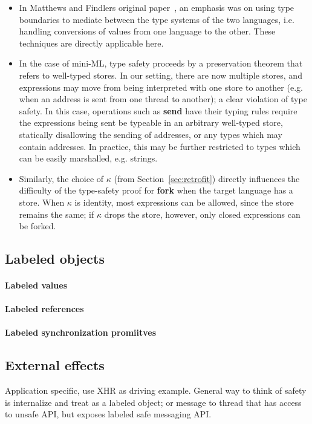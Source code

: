 \begin{itemize}
    \item In Matthews and Findlers original
        paper~\cite{Matthews:2007:OSM:1190216.1190220}, an emphasis was
        on using type boundaries to mediate between the type systems of
        the two languages, i.e. handling conversions of values from
        one language to the other.  These techniques are directly applicable here.

    \item In the case of mini-ML, type safety proceeds by a preservation theorem
        that refers to well-typed stores.  In our setting, there are now multiple
        stores, and expressions may move from being interpreted with one store
        to another (e.g. when an address is sent from one thread to
        another); a clear violation of type safety.  In this case, operations
        such as \textbf{send} have their typing rules require
        the expressions being sent be typeable in an arbitrary well-typed store,
        statically disallowing the sending of addresses, or any types which
        may contain addresses.  In practice, this may be further restricted to
        types which can be easily marshalled, e.g. strings.

    \item Similarly, the choice of $\kappa$ (from Section~\ref{sec:retrofit}) directly
        influences the difficulty of the type-safety proof for
        \textbf{fork} when the target language has a store.  When
        $\kappa$ is identity, most expressions can be allowed, since the store
        remains the same; if $\kappa$ drops the store, however, only closed expressions
        can be forked.
\end{itemize}

\subsection{Labeled objects}
\label{sec:extensions:labeled}

\paragraph{Labeled values}
\paragraph{Labeled references}
\paragraph{Labeled synchronization promiitves}

\subsection{External effects}
\label{sec:extensions:external}
Application specific, use XHR as driving example.
General way to think of safety is internalize and treat as a labeled
object; or message to thread that has access to unsafe API, but
exposes labeled safe messaging API.
